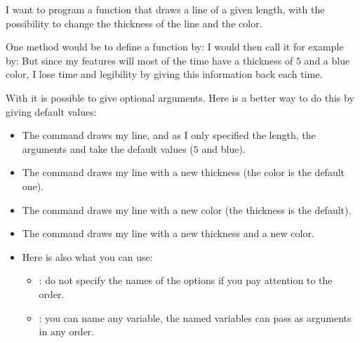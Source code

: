 \documentclass[11pt,class=report,crop=false]{standalone}
\begin{document}
\begin{cours}


I want to program a function that draws a line of a given length, with the possibility to change the thickness of the line and the color.

One method would be to define a function by:
 I would then call it for example by:
But since my features will most of the time have a thickness of $5$ and a blue color, I lose time and legibility by giving this information back each time.

\medskip

With \Python{} it is possible to give optional arguments. Here is a better way to do this by giving default values:
 
\begin{itemize}
  \item The command  draws my line, and as I only specified the length, the arguments  and  take the default values ($5$ and blue).
  
   \item The command  draws my line with a new thickness (the color is the default one).
   
    \item The command  draws my line with a new color (the thickness is the default).  
    
     \item The command  draws my line with a new thickness and a new color.
     
     \item Here is also what you can use:
     \begin{itemize}
       \item {}: do not specify the names of the options if you pay attention to the order.
       \item {}: you can name any variable, the named variables can pass as arguments in any order.
 
  \end{itemize}   
\end{itemize}   
\end{cours}
\end{document}
